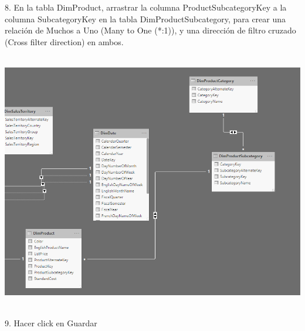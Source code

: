 \begin{flushleft}
\begin{itemize}
\textbf{ }\\
\textbf{ }\\
\textbf{ }\\
\textbf{ }\\
\textbf{ }\\
\textbf{ }\\
\textbf{ }\\
\textbf{ }\\
\textbf{ }\\
\textbf{ }\\
\textbf{ }\\
\textbf{ }\\
\textbf{ }\\
\textbf{ }\\
\textbf{ }\\
8. En la tabla DimProduct, arrastrar la columna ProductSubcategoryKey a la columna SubcategoryKey en la
tabla DimProductSubcategory, para crear una relación de Muchos a Uno (Many to One (*:1)), y una
dirección de filtro cruzado (Cross filter direction) en ambos.\\
\textbf{ }\\
\begin{center}
	\includegraphics[width=20cm]{./Imagenes/img26} 
	\end{center}
\textbf{ }\\
9. Hacer click en Guardar\\
\textbf{ }\\
\textbf{ }\\
\textbf{ }\\
\textbf{ }\\
\textbf{ }\\

\end{itemize}
\end{flushleft}
